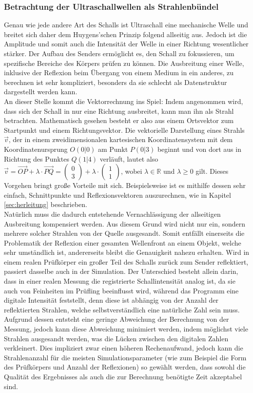 \documentclass[reducespace,stylepage,semiarbeit]{spezidoc}
\newcommand{\vect}[2]{\begin{pmatrix}#1\\#2\end{pmatrix}}
\begin{document}
\subsubsection{Betrachtung der Ultraschallwellen als Strahlenbündel}
Genau wie jede andere Art des Schalls ist Ultraschall eine mechanische Welle und breitet sich daher dem Huygens'schen Prinzip folgend allseitig aus. 
Jedoch ist die Amplitude und somit auch die Intensität der Welle in einer Richtung wesentlicher stärker. Der Aufbau des Senders ermöglicht es, den Schall zu fokussieren, um spezifische Bereiche des Körpers prüfen zu können.
Die Ausbreitung einer Welle, inklusive der Reflexion beim Übergang von einem Medium in ein anderes, zu berechnen ist sehr kompliziert, besonders da sie schlecht als Datenstruktur dargestellt werden kann.\\
An dieser Stelle kommt die Vektorrechnung ins Spiel: Indem angenommen wird, dass sich der Schall in nur eine Richtung ausbreitet, kann man ihn als Strahl betrachten. 
Mathematisch gesehen besteht er also aus einem Ortsvektor zum Startpunkt und einem Richtungsvektor. 
Die vektorielle Darstellung eines Strahls $\vec{v}$, der in einem zweidimensionalen kartesischen Koordinatensystem mit dem Koordinatenursprung $O(0|0)$ am Punkt $P(0|3)$ beginnt und von dort aus in Richtung des Punktes $Q(1|4)$ verläuft, lautet also $\vec{v} = \overrightarrow{OP} + \lambda \cdot \overrightarrow{PQ} = \vect{0}{3} + \lambda \cdot \vect{1}{1}$, wobei $\lambda\in\mathbb{R}$ und $\lambda\geq0$ gilt. 
Dieses Vorgehen bringt große Vorteile mit sich. Beispielsweise ist es mithilfe dessen sehr einfach, Schnittpunkte und Reflexionsvektoren auszurechnen, wie in Kapitel \ref{sec:herleitung} beschrieben.\\
Natürlich muss die dadurch entstehende Vernachlässigung der allseitigen Ausbreitung kompensiert werden. 
Aus diesem Grund wird nicht nur ein, sondern mehrere solcher Strahlen von der Quelle ausgesandt. 
Somit entfällt einerseits die Problematik der Reflexion einer gesamten Wellenfront an einem Objekt, welche sehr umständlich ist, andererseits bleibt die Genauigkeit nahezu erhalten. 
Wird in einem realen Prüfkörper ein großer Teil des Schalls zurück zum Sender reflektiert, passiert dasselbe auch in der Simulation. 
Der Unterschied besteht allein darin, dass in einer realen Messung die registrierte Schallintensität analog ist, da sie auch von Feinheiten im Prüfling beeinflusst wird, während das Programm eine digitale Intensität feststellt, denn diese ist abhängig von der Anzahl der reflektierten Strahlen, welche selbstverständlich eine natürliche Zahl sein muss.\\
Aufgrund dessen entsteht eine geringe Abweichung der Berechnung von der Messung, jedoch kann diese Abweichung minimiert werden, indem möglichst viele Strahlen ausgesandt werden, was die \glqq Lücken\grqq{} zwischen den digitalen Zahlen verkleinert. 
Dies impliziert zwar einen höheren Rechenaufwand, jedoch kann die Strahlenanzahl für die meisten Simulationsparameter (wie zum Beispiel die Form des Prüfkörpers und Anzahl der Reflexionen) so gewählt werden, dass sowohl die Qualität des Ergebnisses als auch die zur Berechnung benötigte Zeit akzeptabel sind.
\end{document}
